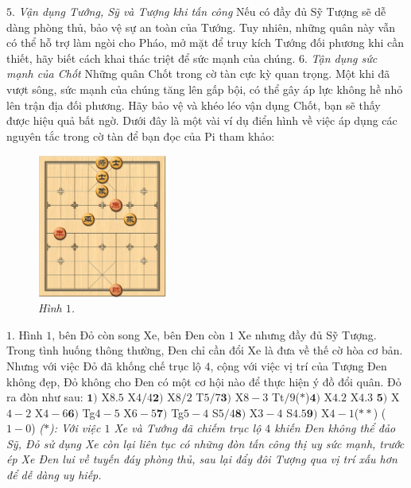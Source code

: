 \begin{multicols}{2}
	\vskip 0.1cm
	$5.$ \textit{Vận dụng Tướng, Sỹ và Tượng khi tấn công}
	\vskip 0.1cm
	Nếu có đầy đủ Sỹ Tượng sẽ dễ dàng phòng thủ, bảo vệ sự an toàn của Tướng. Tuy nhiên, những quân này vẫn có thể hỗ trợ làm ngòi cho Pháo, mở mặt để truy kích Tướng đối phương khi cần thiết, hãy biết cách khai thác triệt để sức mạnh của chúng.
	\vskip 0.1cm
	$6.$ \textit{Tận dụng sức mạnh của Chốt}
	\vskip 0.1cm
	Những quân Chốt trong cờ tàn cực kỳ quan trọng. Một khi đã vượt sông, sức mạnh của chúng tăng lên gấp bội, có thể gây áp lực không hề nhỏ lên trận địa đối phương. Hãy bảo vệ và khéo léo vận dụng Chốt, bạn sẽ thấy được hiệu quả bất ngờ.
	\vskip 0.1cm
	Dưới đây là một vài ví dụ điển hình về việc áp dụng các nguyên tắc trong cờ tàn để bạn đọc của Pi tham khảo:
	\begin{figure}[H]
		\vspace*{-5pt}
		\centering
		\captionsetup{labelformat= empty, justification=centering}
		\includegraphics[width= 0.38\textwidth]{1}
		\caption{\small\textit{\color{gocco}Hình $1$.}}
		\vspace*{-10pt}
	\end{figure}
	$1$. Hình $1$, bên Đỏ còn song Xe, bên Đen còn $1$ Xe nhưng đầy đủ Sỹ Tượng. Trong tình huống thông thường, Đen chỉ cần đổi Xe là đưa về thế cờ hòa cơ bản. Nhưng với việc Đỏ đã khống chế trục lộ $4$, cộng với việc vị trí của Tượng Đen không đẹp, Đỏ không cho Đen có một cơ hội nào để thực hiện ý đồ đổi quân. Đỏ ra đòn như sau:
	\vskip 0.1cm
	$\pmb{1)}$	X$8.5$ X$4/4$\quad $\pmb{2)}$ X$8/2$  T$5/7$\quad $\pmb{3)}$ X$8-3$ Tt$/9$($*$)\quad $\pmb{4)}$ X$4.2$ X$4.3$ \quad$\pmb{5)}$ X$4-2$ X$4-6$\quad $\pmb{6)}$ Tg$4-5$ X$6-5$\quad $\pmb{7)}$ Tg$5-4$ S$5/4$\quad $\pmb{8)}$ X$3-4$ S$4.5$\quad $\pmb{9)}$ X$4-1$($**$) ($1-0$)
	\vskip 0.1cm 
	\textit{($*$): Với việc $1$ Xe và Tướng đã chiếm trục lộ $4$ khiến Đen không thể đảo Sỹ, Đỏ sử dụng Xe còn lại liên tục có những đòn tấn công thị uy sức mạnh, trước ép Xe Đen lui về tuyến đáy phòng thủ, sau lại đẩy đôi Tượng qua vị trí xấu hơn để dễ dàng uy hiếp.
}
\end{multicols}
